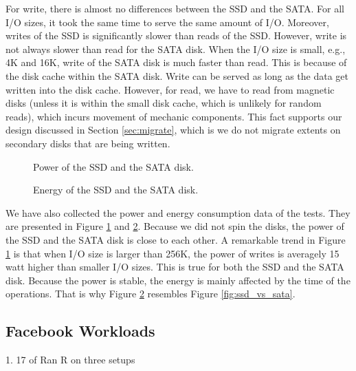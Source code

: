 For write, there is almost no differences between the SSD and the
SATA. For all I/O sizes, it took the same time to serve the same
amount of I/O. Moreover, writes of the SSD is significantly slower
than reads of the SSD.  However, write is not always slower than read
for the SATA disk. When the I/O size is small, e.g., 4K and 16K, write
of the SATA disk is much faster than read. This is because of the disk
cache within the SATA disk. Write can be served as long as the data
get written into the disk cache. However, for read, we have to read
from magnetic disks (unless it is within the small disk cache, which
is unlikely for random reads), which incurs movement of mechanic
components. This fact supports our design discussed in Section
\ref{sec:migrate}, which is we do not migrate extents on secondary
disks that are being written. 

\begin{figure}[t]
\begin{centering}
\caption{Power of the SSD and the SATA disk.}
\label{fig:power}
\end{centering}
\end{figure}

\begin{figure}[t]
\begin{centering}
\caption{Energy of the SSD and the SATA disk.}
\label{fig:energy}
\end{centering}
\end{figure}

We have also collected the power and energy consumption data of the
tests. They are presented in Figure \ref{fig:power} and
\ref{fig:energy}. Because we did not spin the disks, the power of the
SSD and the SATA disk is close to each other. A remarkable trend in 
Figure \ref{fig:power} is that when I/O size is larger than 256K, the
power of writes is averagely 15 watt higher than smaller I/O sizes.
This is true for both the SSD and the SATA disk. Because the power is
stable, the energy is mainly affected by the time of the operations.
That is why Figure \ref{fig:energy} resembles Figure
\ref{fig:ssd_vs_sata}. 

\subsection{Facebook Workloads}

1. 17 of Ran R on three setups

